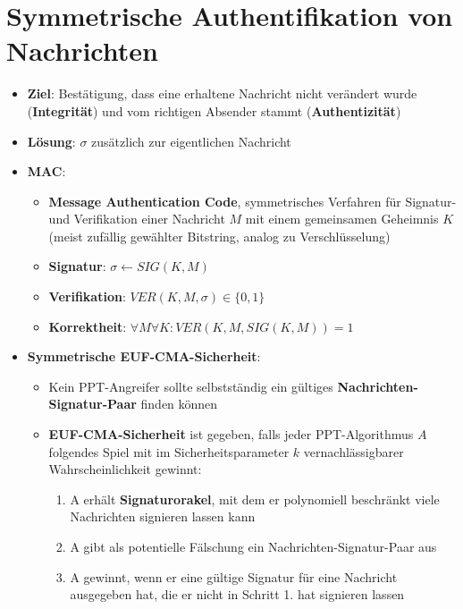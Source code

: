 \section{Symmetrische Authentifikation von Nachrichten}%
\label{symauth:sec:symmetrische_authentifikation_von_nachrichten}

\begin{itemize}
	\item \textbf{Ziel}: Bestätigung, dass eine erhaltene Nachricht nicht verändert wurde (\textbf{Integrität}) und vom richtigen Absender stammt (\textbf{Authentizität})
	\item \textbf{Lösung}:  $\sigma$ zusätzlich zur eigentlichen Nachricht
	\item \textbf{MAC}:
	\begin{itemize}
		\item \textbf{Message Authentication Code}, symmetrisches Verfahren für Signatur- und Verifikation einer Nachricht $M$ mit einem gemeinsamen Geheimnis $K$ (meist zufällig gewählter Bitstring, analog zu Verschlüsselung)
		\item \textbf{Signatur}: $\sigma \leftarrow SIG(K, M)$
		\item \textbf{Verifikation}: $VER(K, M, \sigma) \in \{0, 1\}$
		\item \textbf{Korrektheit}: $\forall M \forall K: VER(K, M, SIG(K, M)) = 1$
	\end{itemize}
	\item \textbf{Symmetrische EUF-CMA-Sicherheit}:
	\begin{itemize}
		\item Kein PPT-Angreifer sollte selbstständig ein gültiges \textbf{Nachrichten-Signatur-Paar} finden können
		\item \textbf{EUF-CMA-Sicherheit} ist gegeben, falls jeder PPT-Algorithmus $A$ folgendes Spiel mit im Sicherheitsparameter $k$ vernachlässigbarer Wahrscheinlichkeit gewinnt:
		\begin{enumerate}
			\item A erhält \textbf{Signaturorakel}, mit dem er polynomiell beschränkt viele Nachrichten signieren lassen kann
			\item A gibt als potentielle Fälschung ein Nachrichten-Signatur-Paar aus
			\item A gewinnt, wenn er eine gültige Signatur für eine Nachricht ausgegeben hat, die er nicht in Schritt 1. hat signieren lassen
		\end{enumerate}
	\end{itemize}

\end{itemize}
